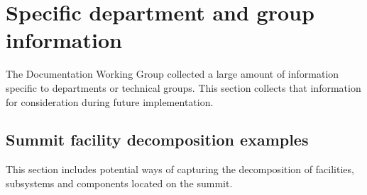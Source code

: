 \section{Specific department and group information}
\label{sec:appendix-examples}

The Documentation Working Group collected a large amount of information specific to departments or technical groups.
This section collects that information for consideration during future implementation.

\subsection{Summit facility decomposition examples}

This section includes potential ways of capturing the decomposition of facilities, subsystems and components located on the summit.






